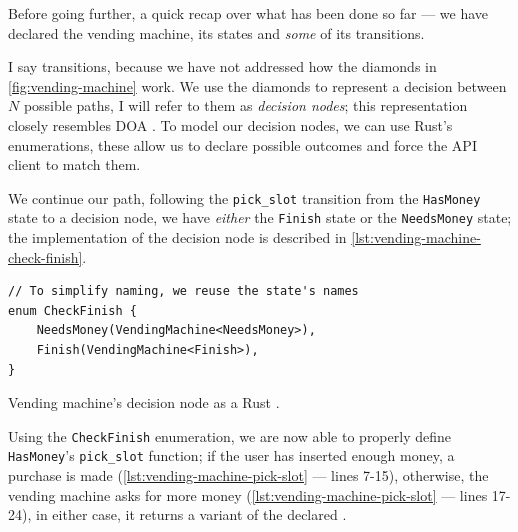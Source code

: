 Before going further, a quick recap over what has been done so far ---
we have declared the vending machine, its states and \emph{some} of its transitions.

I say  transitions, because we have not addressed how the diamonds in \autoref{fig:vending-machine} work.
We use the diamonds to represent a decision between $N$ possible paths, I will refer to them as \emph{decision nodes};
this representation closely resembles \gls{DOA} \cite{Trindade2020}.
To model our decision nodes, we can use Rust's enumerations,
these allow us to declare possible outcomes and force the \gls{API} client to match them.

We continue our path, following the \texttt{pick\_slot} transition from the \textcolor{structblue}{\texttt{HasMoney}} state to a decision node,
we have \emph{either} the \textcolor{structblue}{\texttt{Finish}} state or the \textcolor{structblue}{\texttt{NeedsMoney}} state;
the implementation of the decision node is described in \autoref{lst:vending-machine-check-finish}.

\begin{listing}
    \begin{verbatim}
// To simplify naming, we reuse the state's names
enum CheckFinish {
    NeedsMoney(VendingMachine<NeedsMoney>),
    Finish(VendingMachine<Finish>),
}
\end{verbatim}
    \caption{Vending machine's decision node as a Rust .}
    \label{lst:vending-machine-check-finish}
\end{listing}

Using the \textcolor{structblue}{\texttt{CheckFinish}} enumeration, we are now able to properly define \textcolor{structblue}{\texttt{HasMoney}}'s \texttt{pick\_slot} function;
if the user has inserted enough money, a purchase is made (\autoref{lst:vending-machine-pick-slot} --- lines 7-15),
otherwise, the vending machine asks for more money (\autoref{lst:vending-machine-pick-slot} --- lines 17-24),
in either case, it returns a variant of the declared .

